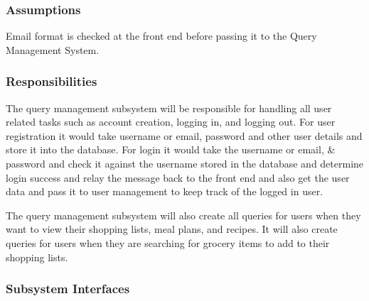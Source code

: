 \subsubsection{Assumptions}
Email format is checked at the front end before passing it to the Query Management System.

\subsubsection{Responsibilities}
The query management subsystem will be responsible for handling all user related tasks such as account creation, logging in, and logging out. For user registration it would take username or email, password and other user details and store it into the database. For login it would take the username or email, \& password and check it against the username stored in the database and determine login success and relay the message back to the front end and also get the user data and pass it to user management to keep track of the logged in user.

The query management subsystem will also create all queries for users when they want to view their shopping lists, meal plans, and recipes. It will also create queries for users when they are searching for grocery items to add to their shopping lists.

\subsubsection{Subsystem Interfaces}

